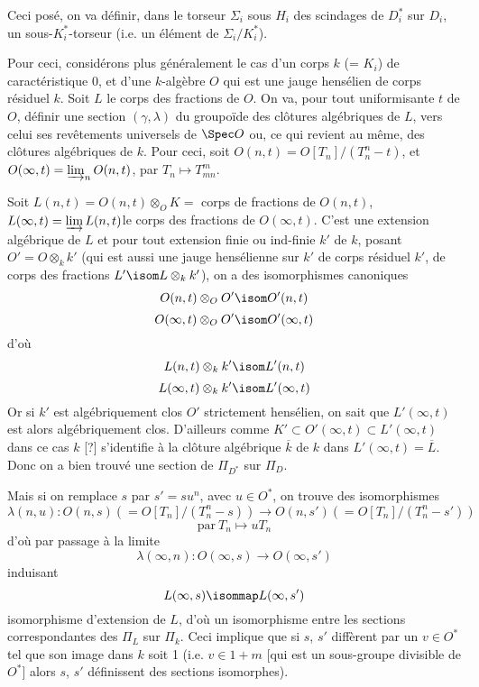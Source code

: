 Ceci posé, on va définir, dans le torseur $\Sigma_i$ sous $H_i$ des scindages de $D^*_i$ sur $D_i$, un sous-$K^*_i$-torseur (i.e. un élément de $\Sigma_i/K^*_i$).

Pour ceci, considérons plus généralement le cas d'un corps $k$ (= $K_i$) de caractéristique $0$, et d'une $k$-algèbre $O$ qui est une jauge hensélien de corps résiduel $k$. Soit $L$ le corps des fractions de $O$. On va, pour tout uniformisante $t$ de $O$, définir une section $(\gamma, \lambda)$ du groupoïde des clôtures algébriques de $L$, vers celui ses revêtements universels de $\Spec O$ ou, ce qui revient au même, des clôtures algébriques de $k$. Pour ceci, soit $O(n, t) = O[T_n]/(T^n_n - t)$, et $O(\infty, t) = \varinjlim_n O (n, t)$, par $T_n \mapsto T^m_{mn}$.

Soit $L(n, t) = O(n, t) \otimes_O K =$ corps de fractions de $O(n, t)$, $L(\infty, t) = \varinjlim L(n, t)$le corps des fractions de $O(\infty, t)$. C'est une extension algébrique de $L$ et pour tout extension finie ou ind-finie $k'$ de $k$, posant $O' = O \otimes_k k'$ (qui est aussi une jauge hensélienne sur $k'$ de corps résiduel $k'$, de corps des fractions $L' \isom L \otimes_k k'$), on a des isomorphismes canoniques
$$
O(n, t) \otimes_O O' \isom O'(n, t)
$$
$$
O(\infty, t) \otimes_O O' \isom O'(\infty, t)
$$
d'où
$$
L(n, t) \otimes_k k' \isom L'(n, t)
$$
$$
L(\infty, t) \otimes_k k' \isom L'(\infty, t)
$$
Or si $k'$ est algébriquement clos $O'$ strictement hensélien, on sait que $L'(\infty, t)$ est alors algébriquement clos. D'ailleurs comme $K' \subset  O'(\infty, t) \subset  L'(\infty, t)$ dans ce cas $k$ [?] s'identifie à la clôture algébrique $\overline{k}$ de $k$ dans $L'(\infty, t) = \overline{L}$. Donc on a bien trouvé une section de $\Pi_{D^*}$ sur $\Pi_D$.

Mais si on remplace $s$ par $s' = su^n$, avec $u \in O^*$, on trouve des isomorphismes
$$
\lambda(n, u): O(n, s)(= O[T_n]/(T^n_n - s)) \to O(n, s')(= O[T_n]/(T^n_n - s'))
$$
$$
\text{par}~T_n \mapsto uT_n
$$
d'où par passage à la limite
$$
\lambda(\infty, n): O(\infty, s) \to O(\infty, s')
$$
induisant
$$
L(\infty, s) \isommap L(\infty, s')
$$
isomorphisme d'extension de $L$, d'où un isomorphisme entre les sections correspondantes des $\Pi_L$ sur $\Pi_k$. Ceci implique que si $s$, $s'$ diffèrent par un $v \in O^*$ tel que son image dans $k$ soit 1 (i.e. $v \in 1 + m$ [qui est un sous-groupe divisible de $O^*$] alors $s$, $s'$ définissent des sections isomorphes).

